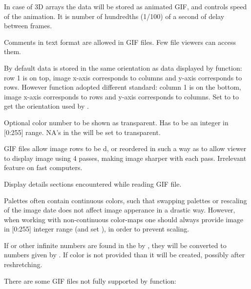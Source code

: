 \begin{Arguments}
\begin{ldescription}
\item[\code{delay}] In case of 3D arrays the data will be stored as animated GIF, and
 controls speed of the animation. It is number of hundredths 
(1/100) of a second of delay between frames. 
\item[\code{comment}] Comments in text format are allowed in GIF files. Few file 
viewers can access them.
\item[\code{flip}] By default data is stored in the same orientation as data 
displayed by  function: row 1 is on top, image x-axis 
corresponds to columns and y-axis corresponds to rows. However function 
 adopted different standard: column 1 is on the bottom, 
image x-axis corresponds to rows and y-axis corresponds to columns. Set 
 to  to get the orientation used by . 
\item[\code{transparent}] Optional color number to be shown as transparent. Has to be an
integer in [0:255] range. NA's in the  will be set to transparent.
\item[\code{interlace}] GIF files allow image rows to be d, or 
reordered in such a way as to allow viewer to display image using 4 passes, 
making image sharper with each pass. Irrelevant feature on fast computers.
\item[\code{verbose}] Display details sections encountered while reading GIF file.
\end{ldescription}
\end{Arguments}
\begin{Details}\relax
Palettes often contain continuous colors, such that swapping palettes or 
rescaling of the image date does not affect image apperance in a drastic way. 
However, when working with non-continuous color-maps one should always provide 
image in [0:255] integer range (and set ), in order to 
prevent scaling.

If  or other infinite numbers are found in the  by 
, they will be converted to numbers given by .
If  color is not provided than it will be created, possibly 
after reshretching.

There are some GIF files not fully supported by  function:
\end{Details}
